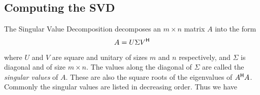 \subsection*{Computing the SVD}


The Singular Value Decomposition decomposes an $m \times n$ matrix $A$ into the form
\begin{equation*}
A = U \Sigma V^{\mathsf H}
\end{equation*}
where $U$ and $V$ are square and unitary of sizes $m$ and $n$ respectively, and $\Sigma$ is diagonal and of size $m \times n$.
The values along the diagonal of $\Sigma$ are called the \emph{singular values} of $A$.
These are also the square roots of the eigenvalues of $A^{\mathsf H} A$.
Commonly the singular values are listed in decreasing order. Thus we have

